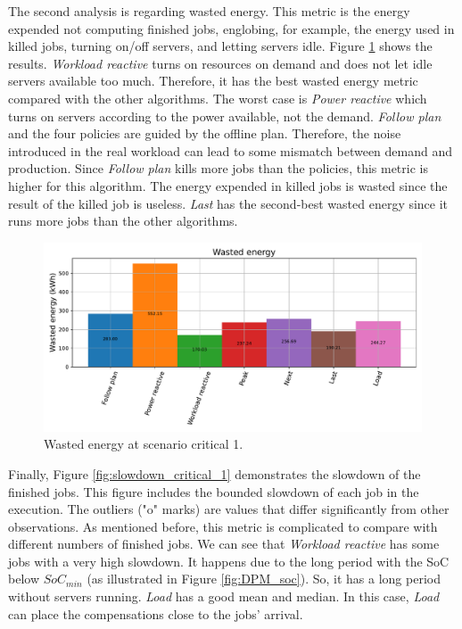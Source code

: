 The second analysis is regarding wasted energy. This metric is the energy expended not computing finished jobs, englobing, for example, the energy used in killed jobs, turning on/off servers, and letting servers idle. Figure \ref{fig:energy_critical_1} shows the results. \emph{Workload reactive} turns on resources on demand and does not let idle servers available too much. Therefore, it has the best wasted energy metric compared with the other algorithms. The worst case is \emph{Power reactive} which turns on servers according to the power available, not the demand. \emph{Follow plan} and the four policies are guided by the offline plan. Therefore, the noise introduced in the real workload can lead to some mismatch between demand and production. Since \emph{Follow plan} kills more jobs than the policies, this metric is higher for this algorithm. The energy expended in killed jobs is wasted since the result of the killed job is useless. \emph{Last} has the second-best wasted energy since it runs more jobs than the other algorithms.

\begin{figure}[!htb]
    \centering
    \includegraphics[scale=0.55]{Images/Compensations/energy_critical_1.pdf}
    \caption{Wasted energy at scenario critical 1.}
    \label{fig:energy_critical_1}
\end{figure}

Finally, Figure \ref{fig:slowdown_critical_1} demonstrates the slowdown of the finished jobs. This figure includes the bounded slowdown of each job in the execution. The outliers ("o" marks) are values that differ significantly from other observations. As mentioned before, this metric is complicated to compare with different numbers of finished jobs. We can see that \emph{Workload reactive} has some jobs with a very high slowdown. It happens due to the long period with the SoC below $SoC_{min}$ (as illustrated in Figure \ref{fig:DPM_soc}). So, it has a long period without servers running. \emph{Load} has a good mean and median. In this case, \emph{Load} can place the compensations close to the jobs' arrival. 

